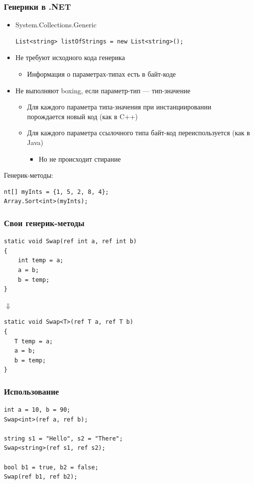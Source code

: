 \documentclass[xetex,mathserif,serif]{beamer}
\begin{document}
	\begin{frame}[fragile]
		\frametitle{Генерики в .NET}
		\begin{itemize}
			\item System.Collections.Generic
			\begin{verbatim}
List<string> listOfStrings = new List<string>();
			\end{verbatim}
			\item Не требуют исходного кода генерика
			\begin{itemize}
				\item Информация о параметрах-типах есть в байт-коде
			\end{itemize}
			\item Не выполняют boxing, если параметр-тип --- тип-значение
			\begin{itemize}
				\item Для каждого параметра типа-значения при инстанциировании порождается новый код (как в C++)
				\item Для каждого параметра ссылочного типа байт-код переиспользуется (как в Java)
				\begin{itemize}
					\item Но не происходит стирание
				\end{itemize}
			\end{itemize}
		\end{itemize}

		Генерик-методы:
		\begin{verbatim}
nt[] myInts = {1, 5, 2, 8, 4};
Array.Sort<int>(myInts);
		\end{verbatim}
	\end{frame}

	\begin{frame}[fragile]
		\frametitle{Свои генерик-методы}
		\begin{verbatim}
static void Swap(ref int a, ref int b)
{
    int temp = a;
    a = b;
    b = temp;
}
		\end{verbatim}
		\hspace{2cm} $\Downarrow$
		\begin{verbatim}
static void Swap<T>(ref T a, ref T b)
{
   T temp = a;
   a = b;
   b = temp;
}
		\end{verbatim}
	\end{frame}

	\begin{frame}[fragile]
		\frametitle{Использование}
		\begin{verbatim}
int a = 10, b = 90;
Swap<int>(ref a, ref b);

string s1 = "Hello", s2 = "There";
Swap<string>(ref s1, ref s2);

bool b1 = true, b2 = false;
Swap(ref b1, ref b2);
		\end{verbatim}
	\end{frame}
\end{document}
